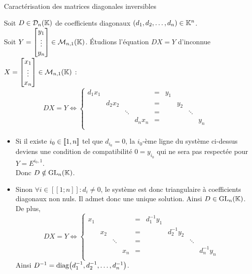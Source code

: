 \documentclass{article}
\renewenvironment{question_kholle}[2][ ]
{
	\subsection{\texorpdfstring{#2}{}}
	\notblank{#1}
	{
		\noindent #1
		\bigbreak
	}
	{}
	\begin{proof}
}
{
	\end{proof}
}
\begin{document}
\begin{question_kholle}
	{Caractérisation des matrices diagonales inversibles}

	Soit $D \in \mathcal{D}_n(\mathbb K)$ de coefficients diagonaux $(d_1, d_2, \ldots, d_n) \in \mathbb K^n$. \\
	Soit $Y = \begin{bmatrix} y_1 \\ \vdots \\ y_n \end{bmatrix} \in \mathcal{M}_{n,1}(\mathbb K)$.
	\'Etudions l'équation $DX = Y$ d'inconnue $X = \begin{bmatrix} x_1 \\ \vdots \\ x_n \end{bmatrix} \in \mathcal{M}_{n,1}(\mathbb K)$ :
	\begin{equation*}
		DX = Y \iff
		\left\{ \begin{array}{cccccccccc}
			d_1 x_1 &         &        &         & = & y_1 &     &        &       \\
			        & d_2 x_2 &        &         & = &     & y_2 &        &     & \\
			        &         & \ddots &         & = &     &     & \ddots &       \\
			        &         &        & d_n x_n & = &     &     &        & y_n   \\
		\end{array} \right.
	\end{equation*}

	\begin{itemize}
		\item Si il existe $i_0 \in [\![ 1,n ]\!]$ tel que $d_{i_0} = 0$, la $i_0$-ème ligne du système ci-dessus deviens une condition de compatibilité $0 = y_{i_0}$ qui ne sera pas respectée pour $Y = E^{i_0,1}$.\\
		      Donc $D \notin \mathrm{GL}_{n}(\mathbb K)$.
		\item Sinon $\forall i \in [\![1;n]\!] : d_i \neq 0$, le système est donc triangulaire à coefficients diagonaux non nuls. Il admet donc une unique solution. Ainsi $D \in \mathrm{GL}_{n}(\mathbb K)$. De plus,
		      \begin{equation*}
			      DX = Y \iff
			      \left\{ \begin{array}{cccccccccc}
				      x_1 &     &        &     & = & d_1^{-1} y_1 &              &        &                \\
				          & x_2 &        &     & = &              & d_2^{-1} y_2 &        &              & \\
				          &     & \ddots &     & = &              &              & \ddots &                \\
				          &     &        & x_n & = &              &              &        & d_n^{-1} y_n   \\
			      \end{array} \right.
		      \end{equation*}
		      Ainsi $D^{-1} = \operatorname{diag}\!\left(d_1^{-1}, d_2^{-1}, \ldots, d_n^{-1}\right)$.
	\end{itemize}
\end{question_kholle}
\end{document}
